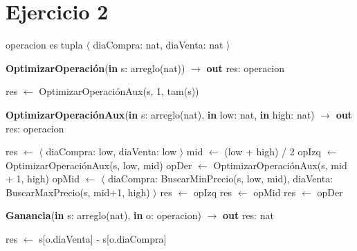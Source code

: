 \section{Ejercicio 2}

operacion es tupla $\langle$ diaCompra: nat, diaVenta: nat $\rangle$

\begin{algorithm}[H]
\caption{
    \textbf{OptimizarOperación}(\textbf{in} s: arreglo(nat)) $\to$ \textbf{out} res: operacion
}
\begin{algorithmic}[1]
    \State res $\gets$ OptimizarOperaciónAux(s, 1, tam(s))
\end{algorithmic}
\end{algorithm}

\begin{algorithm}[H]
\caption{
    \textbf{OptimizarOperaciónAux}(\textbf{in} s: arreglo(nat), \textbf{in} low: nat, \textbf{in} high: nat) $\to$ \textbf{out} res: operacion
}
\begin{algorithmic}[1]
        \State res $\gets$ $\langle$ diaCompra: low, diaVenta: low $\rangle$
    \Else
        \State mid $\gets$ (low + high) / 2
        \State opIzq $\gets$ OptimizarOperaciónAux(s, low, mid)
        \State opDer $\gets$ OptimizarOperaciónAux(s, mid + 1, high)
        \State opMid $\gets$ $\langle$ diaCompra: BuscarMinPrecio(s, low, mid), diaVenta: BuscarMaxPrecio(s, mid+1, high) $\rangle$
            \State res $\gets$ opIzq
            \State res $\gets$ opMid
        \Else
            \State res $\gets$ opDer
        \EndIf
    \EndIf
\end{algorithmic}
\end{algorithm}

\begin{algorithm}[H]
\caption{
    \textbf{Ganancia}(\textbf{in} s: arreglo(nat), \textbf{in} o: operacion) $\to$ \textbf{out} res: nat
}
\begin{algorithmic}[1]
    \State res $\gets$ s[o.diaVenta] - s[o.diaCompra]
\end{algorithmic}
\end{algorithm}
